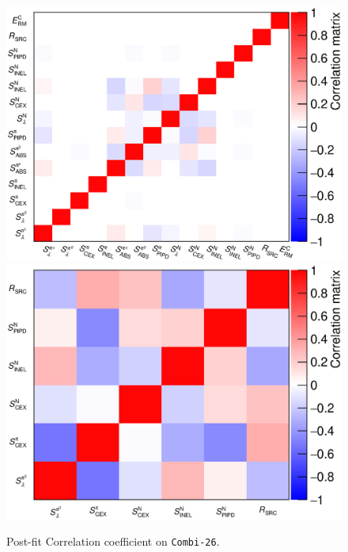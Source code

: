\begin{figure}[!htb] 	
    \centering 		

    \includegraphics[width=\dbfigwid\textwidth]{figures/result_test_comb_26_cor_allpar.eps}
    \includegraphics[width=\dbfigwid\textwidth]{figures/result_test_comb_26_cor_redpar.eps}
    \caption{ Post-fit Correlation coefficient on \texttt{Combi-26}. } 
\end{figure}

